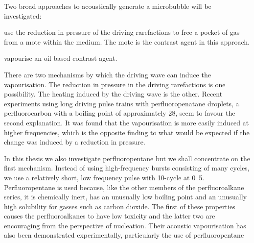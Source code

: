 Two broad approaches to acoustically generate a microbubble will be investigated:
\nlist
{
\item use the reduction in pressure of the driving rarefactions to free a pocket of gas from a mote within the medium.
The mote is the contrast agent in this approach.
\item vapourise an oil based contrast agent.  

There are two mechanisms by which the driving wave can induce the vapourisation.
The reduction in pressure in the driving rarefactions is one possibility.
The heating induced by the driving wave is the other.
Recent experiments using long driving pulse trains with perfluoropenatane droplets,
a perfluorocarbon with a boiling point of approximately 28\degree\cite{}, 
seem to favour the second explanation.
It was found that the vapourisation is more easily induced at higher frequencies\cite{Burns},
which is the opposite finding to what would be expected if the change was induced by a reduction in pressure. 

In this thesis we also investigate perfluoropentane but we shall concentrate on the first mechanism.
Instead of using high-frequency bursts consisting of many cycles,
we use a relatively short, low frequency pulse with 10-cycle at \unit{0.5}\mega\pascal.
Perfluoropentane is used because, like the other members of the perfluoroalkane series,
it is chemically inert, has an unusually low boiling point and an unusually high solubility for gasses such as carbon dioxide.
The first of these properties causes the perfluoroalkanes to have low toxicity
and the latter two are encouraging from the perspective of nucleation.
Their acoustic vapourisation has also been demonstrated experimentally,
particularly the use of perfluoropentane\cite{Kripfgans2000,Rapoport2007}
}






